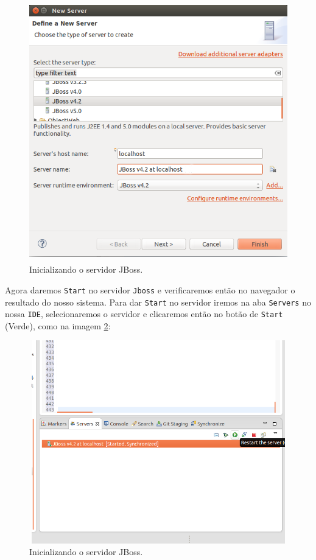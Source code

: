 \begin{figure}[H]
	\centering
	\includegraphics[width=400pt,height=320pt]{imgs/tutorial-mdarte-0022.png}
	\caption{Inicializando o servidor JBoss.}
	\label{cria_server_eclipse}
\end{figure}

Agora daremos \texttt{Start} no servidor \texttt{Jboss} e verificaremos então no
navegador o resultado do nosso sistema. Para dar \texttt{Start} no servidor
iremos na aba \texttt{Servers} no nossa \texttt{IDE}, selecionaremos o servidor
e clicaremos então no botão de \texttt{Start} (Verde), como na imagem
\ref{server_start}:
\begin{figure}[H]
	\centering
	\includegraphics[width=400pt,height=250pt]{imgs/tutorial-mdarte-0015.png}
	\caption{Inicializando o servidor JBoss.}
	\label{server_start}
\end{figure}

